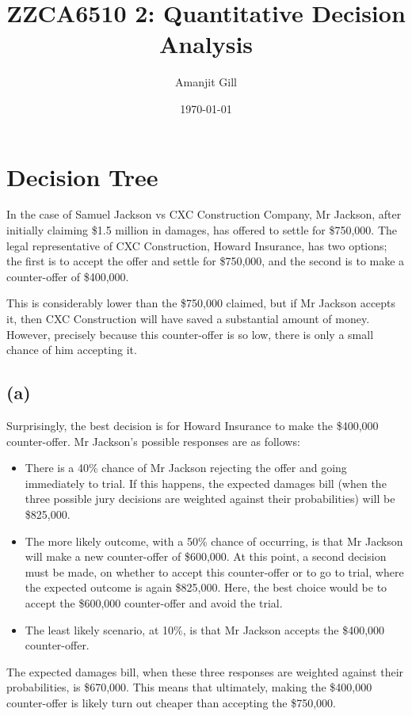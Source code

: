\documentclass[11pt, a4paper]{article}
\title{\Large\bfseries ZZCA6510 2: Quantitative Decision Analysis}
\author{\large Amanjit Gill}
\date{\small \today}
\begin{document}
    
    \maketitle

    \section{Decision Tree}

    In the case of Samuel Jackson vs CXC Construction Company, Mr Jackson, after initially claiming \$1.5 million in damages, has offered to settle for \$750,000. The legal representative of CXC Construction, Howard Insurance, has two options; the first is to accept the offer and settle for \$750,000, and the second is to make a counter-offer of \$400,000. 

    This is considerably lower than the \$750,000 claimed, but if Mr Jackson accepts it, then CXC Construction will have saved a substantial amount of money. However, precisely because this counter-offer is so low, there is only a small chance of him accepting it.

    \subsection*{(a)}

    Surprisingly, the best decision is for Howard Insurance to make the \$400,000 counter-offer. Mr Jackson's possible responses are as follows:

    \begin{itemize}
        \item There is a 40\% chance of Mr Jackson rejecting the offer and going immediately to trial. If this happens, the expected damages bill (when the three possible jury decisions are weighted against their probabilities) will be \$825,000.
        \item The more likely outcome, with a 50\% chance of occurring, is that Mr Jackson will make a new counter-offer of \$600,000. At this point, a second decision must be made, on whether to accept this counter-offer or to go to trial, where the expected outcome is again \$825,000. Here, the best choice would be to accept the \$600,000 counter-offer and avoid the trial.
        \item The least likely scenario, at 10\%, is that Mr Jackson accepts the \$400,000 counter-offer.
    \end{itemize}

    The expected damages bill, when these three responses are weighted against their probabilities, is \$670,000. This means that ultimately, making the \$400,000 counter-offer is likely turn out cheaper than accepting the \$750,000.
\end{document}
